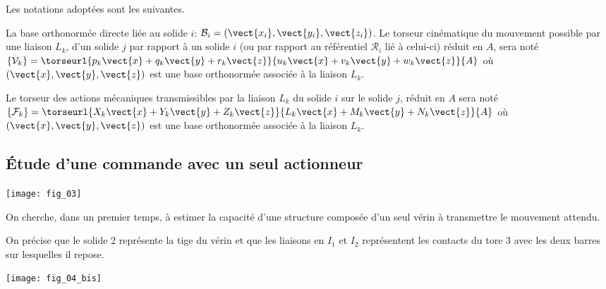 Les notations adoptées sont les suivantes.

La base orthonormée directe liée au solide $i$: $\mathcal{B}_i = \left(\vect{x_i},\vect{y_i},\vect{z_i}\right)$. Le torseur cinématique du mouvement possible par une liaison $L_k$, d’un solide $j$ par rapport à un solide $i$
(ou par rapport au référentiel $\mathcal{R}_i$ lié à celui-ci) réduit en $A$, sera noté $\left\{ \mathcal{V}_k\right\}=\torseurl{p_k \vect{x}+q_k\vect{y}+r_k\vect{z}}{u_k \vect{x}+v_k\vect{y}+w_k\vect{z}}{A}$ où $\left(\vect{x},\vect{y},\vect{z}\right)$ est une base orthonormée associée à la liaison $L_k$. 

Le torseur des actions mécaniques transmissibles par la liaison $L_k$ du solide $i$ sur le solide $j$, réduit en $A$ sera noté $\left\{ \mathcal{F}_k\right\}=\torseurl{X_k \vect{x}+Y_k\vect{y}+Z_k\vect{z}}{L_k \vect{x}+M_k\vect{y}+N_k\vect{z}}{A}$ où $\left(\vect{x},\vect{y},\vect{z}\right)$ est une base orthonormée associée à la liaison $L_k$. 

\subsection*{Étude d'une commande avec un seul actionneur}

\begin{marginfigure}
\texttt{[image: fig\_03]}
\end{marginfigure}

\begin{obj}
On cherche, dans un premier temps, à estimer la capacité d'une structure composée d'un seul vérin
à transmettre le mouvement attendu.
\end{obj}

On précise que le solide 2 représente la tige du vérin et que les liaisons en $I_1$ et $I_2$ représentent les contacts du
tore 3 avec les deux barres sur lesquelles il repose.

\begin{marginfigure}
\texttt{[image: fig\_04\_bis]}
\end{marginfigure}


